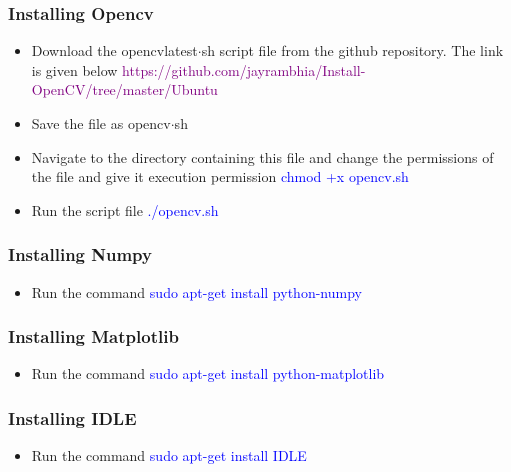 \documentclass[a4paper,12pt]{article}
\begin{document}
\subsubsection*{Installing Opencv}
\begin{itemize}
 \item Download the opencv\textunderscore latest$\cdot$sh script file from the github repository. The link is given below
 \newline \textcolor{purple}{https://github.com/jayrambhia/Install-OpenCV/tree/master/Ubuntu}
 
 \item Save the file as opencv$\cdot$sh
 
 \item Navigate to the directory containing this file and change the permissions of the file and give it execution permission
 \newline \textcolor{blue}{chmod +x opencv.sh}
 
 \item Run the script file
 \newline \textcolor{blue}{./opencv.sh}
 \end{itemize}

\subsubsection*{Installing Numpy}
\begin{itemize}
 \item Run the command 
  \newline \textcolor{blue}{sudo apt-get install python-numpy}
\end{itemize}

\subsubsection*{Installing Matplotlib}
\begin{itemize}
 \item Run the command
  \newline \textcolor{blue}{sudo apt-get install python-matplotlib}
\end{itemize}

\subsubsection*{Installing IDLE}
\begin{itemize}
 \item Run the command
   \newline \textcolor{blue}{sudo apt-get install IDLE}
\end{itemize}
\end{document}
